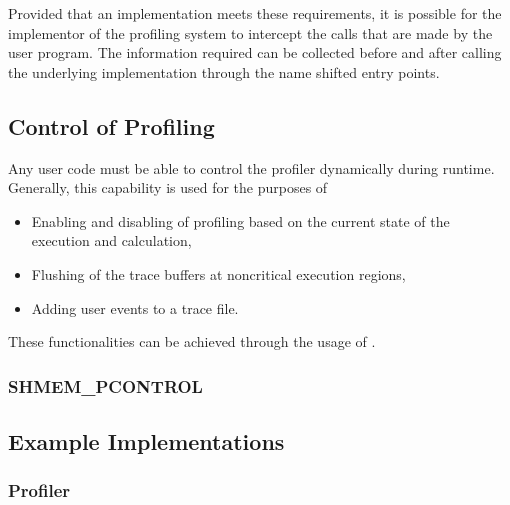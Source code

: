 Provided that an \openshmem implementation meets these requirements,
it is possible for the implementor of the profiling system
to intercept the \openshmem calls that are made by the user
program. The information required can be collected before and after
calling the underlying \openshmem implementation through the name
shifted entry points.

\subsection{Control of Profiling}
\label{sec:pshmem_control_profile}
Any user code must be able to control the profiler dynamically
during runtime. Generally, this capability is used for the
purposes of

\begin{itemize}
\item Enabling and disabling of profiling based on the current
state of the execution and calculation,
\item Flushing of the trace buffers at noncritical execution
regions,
\item Adding user events to a trace file.
\end{itemize}

These functionalities can be achieved through the usage of
.

\subsubsection{\textbf{SHMEM\_PCONTROL}}\label{subsec:shmem_pcontrol}




\subsection{Example Implementations}
\label{sec:pshmem_example_implementations}

\subsubsection{Profiler}
\label{sec:pshmem_example_profiler}


